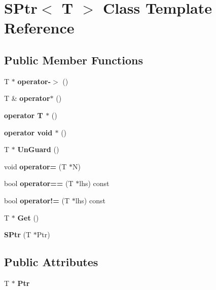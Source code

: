 \section{\-S\-Ptr$<$ \-T $>$ \-Class \-Template \-Reference}
\label{classSPtr}
\subsection*{\-Public \-Member \-Functions}
\begin{DoxyCompactItemize}
\item 
\-T $\ast$ {\bfseries operator-\/$>$} ()\label{classSPtr_af6e485beee07fd401de29c8cdf898c69}

\item 
\-T \& {\bfseries operator$\ast$} ()\label{classSPtr_af7f8c6b921dca2b94f6e7ee14e762770}

\item 
{\bfseries operator T $\ast$} ()\label{classSPtr_a4e20322854ce5d78776cdaf1a87aacd9}

\item 
{\bfseries operator void $\ast$} ()\label{classSPtr_a0b32021b12206ef34495c688760c44bf}

\item 
\-T $\ast$ {\bfseries \-Un\-Guard} ()\label{classSPtr_a138f89ea209d517d530b808e524125e1}

\item 
void {\bfseries operator=} (\-T $\ast$\-N)\label{classSPtr_a4f37889697348747d7432d0e8368a7fd}

\item 
bool {\bfseries operator==} (\-T $\ast$lhs) const \label{classSPtr_a8039659521ab9ef2bb9ab69befd8792a}

\item 
bool {\bfseries operator!=} (\-T $\ast$lhs) const \label{classSPtr_ad28d3ead733e4eb4aa84e9e1e686fd8d}

\item 
\-T $\ast$ {\bfseries \-Get} ()\label{classSPtr_a9381b54160045cd20c4246fc8d23da10}

\item 
{\bfseries \-S\-Ptr} (\-T $\ast$\-Ptr)\label{classSPtr_ae25b5a3a226199c04f79452e31ad047d}

\end{DoxyCompactItemize}
\subsection*{\-Public \-Attributes}
\begin{DoxyCompactItemize}
\item 
\-T $\ast$ {\bfseries \-Ptr}\label{classSPtr_a89d6013a0fce85f8d86599a3d328aac0}

\end{DoxyCompactItemize}
